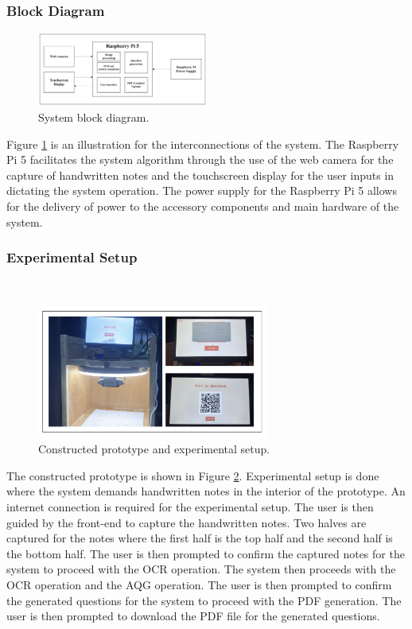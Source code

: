 \documentclass[conference]{IEEEtran}
\begin{document}
\subsubsection{Block Diagram}
\hfill 
\begin{figure}[H]
\centerline{\includegraphics[width=0.5\textwidth]{blockdiag.png}}
\vspace{-0.4cm}
\caption{System block diagram.} 
\label{blockdiag}
\end{figure}
\indent Figure \ref{blockdiag} is an illustration for the interconnections 
of the system. The Raspberry Pi 5 facilitates the system algorithm 
through the use of the web camera for the capture of handwritten notes and 
the touchscreen display for the user inputs in dictating the system 
operation. The power supply for the Raspberry Pi 5 allows for the delivery 
of power to the accessory components and main hardware of the system.
    \vspace{0.1cm}
    \subsubsection{Experimental Setup}
    \hfill \\
\vspace{-0.6cm}
\begin{figure}[H]
\centerline{\includegraphics[width=3in]{experimental.png}}
\vspace{-0.4cm}
\caption{Constructed prototype and experimental setup.} 
\label{experimental_setup}
\end{figure}
\indent The constructed prototype is shown in Figure \ref{experimental_setup}.
Experimental setup is done where the system demands handwritten notes 
in the interior of the prototype. An internet connection is required for
the experimental setup. The user is then guided by the front-end 
to capture the handwritten notes. Two halves are captured for the
notes where the first half is the top half and the second half is the
bottom half. The user is then prompted to confirm the captured notes
for the system to proceed with the OCR operation. The system then
proceeds with the OCR operation and the AQG operation. The user is then
prompted to confirm the generated questions for the system to proceed
with the PDF generation. The user is then prompted to download the PDF
file for the generated questions.
\end{document}
